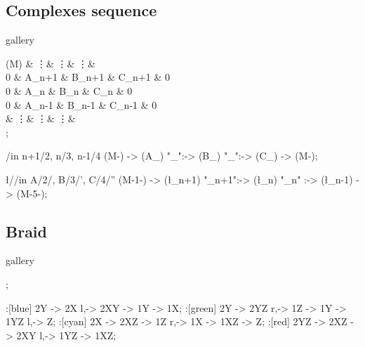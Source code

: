 \clearpage

\subsection{Complexes sequence}

\begin{tcblisting}{gallery}
\begin{codi}
  \obj (M) {   & \vdots  & \vdots  & \vdots  &   \\
             0 & A_{n+1} & B_{n+1} & C_{n+1} & 0 \\
             0 & A_{n}   & B_{n}   & C_{n}   & 0 \\
             0 & A_{n-1} & B_{n-1} & C_{n-1} & 0 \\
               & \vdots  & \vdots  & \vdots  &   \\ };

  \foreach \n/\row in {n+1/2, n/3, n-1/4}
    \mor (M-) -> (A_{\n}) "\alpha_{\n}":-> (B_{\n})
                                 "\beta_{\n}":-> (C_{\n}) -> (M-);

  \foreach \l/\col/\q in {A/2/, B/3/', C/4/''}
    \mor (M-1-\col) -> (\l_{n+1}) "\partial\q_{n+1}":-> (\l_{n})
                                  "\partial\q_{n}"  :-> (\l_{n-1}) -> (M-5-\col);
\end{codi}
\end{tcblisting}

\clearpage

\subsection{Braid}

\begin{tcblisting}{gallery}
\begin{codi}[l/.style={bend left}, r/.style={bend right} ]
  ;
  
  \mor :[blue]  2Y  -> 2X  l,-> 2XY   -> 1Y  -> 1X;
  \mor :[green] 2Y  -> 2YZ r,-> 1Z    -> 1Y  -> 1YZ l,-> Z;
  \mor :[cyan]  2X  -> 2XZ   -> 1Z  r,-> 1X  -> 1XZ   -> Z;
  \mor :[red]   2YZ -> 2XZ   -> 2XY l,-> 1YZ -> 1XZ;
\end{codi}
\end{tcblisting}

